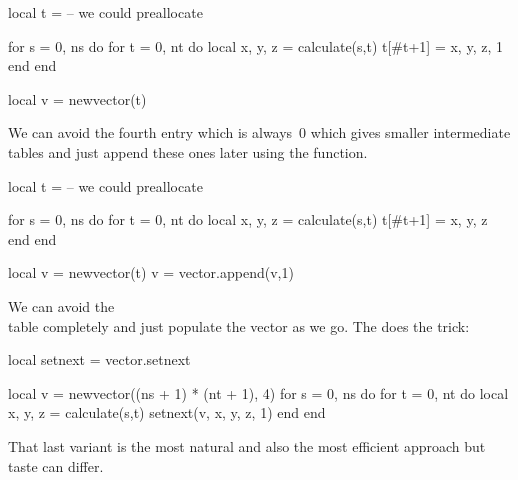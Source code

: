 \starttyping[option=LUA]
local t = { }  -- we could preallocate

for s = 0, ns do
    for t = 0, nt do
        local x, y, z = calculate(s,t)
        t[#t+1] = { x, y, z, 1 }
   end
end

local v = newvector(t)
\stoptyping

We can avoid the fourth entry which is always~0 which gives smaller
intermediate tables and just append these ones later using
the  function.

\starttyping[option=LUA]
local t = { }  -- we could preallocate

for s = 0, ns do
    for t = 0, nt do
        local x, y, z = calculate(s,t)
        t[#t+1] = { x, y, z }
   end
end

local v = newvector(t)
v = vector.append(v,1)
\stoptyping

We can avoid the \LUA\\ table completely and just populate the
vector as we go. The  does the trick:

\starttyping[option=LUA]
local setnext = vector.setnext

local v = newvector((ns + 1) * (nt + 1), 4)
for s = 0, ns do
    for t = 0, nt do
        local x, y, z = calculate(s,t)
        setnext(v, x, y, z, 1)
   end
end
\stoptyping

That last variant is the most natural and also the most efficient approach but
taste can differ.

\stopsubsection

\stopsection

\stopdocument

%
